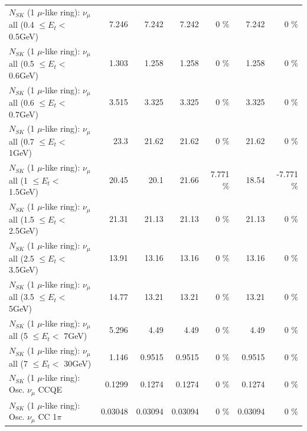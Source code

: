 \begin{table}
\begin{tabular}{| l | r | r | r  r | r  r |}
       $N_{SK}$ (1 $\mu$-like ring): $\nu_{\mu}$ all (0.4 $\leq E_{t} <$ 0.5GeV) &           7.246 &           7.242 &           7.242 &        0 \%  &           7.242 &        0 \%  \\ 
       $N_{SK}$ (1 $\mu$-like ring): $\nu_{\mu}$ all (0.5 $\leq E_{t} <$ 0.6GeV) &           1.303 &           1.258 &           1.258 &        0 \%  &           1.258 &        0 \%  \\ 
       $N_{SK}$ (1 $\mu$-like ring): $\nu_{\mu}$ all (0.6 $\leq E_{t} <$ 0.7GeV) &           3.515 &           3.325 &           3.325 &        0 \%  &           3.325 &        0 \%  \\ 
         $N_{SK}$ (1 $\mu$-like ring): $\nu_{\mu}$ all (0.7 $\leq E_{t} <$ 1GeV) &            23.3 &           21.62 &           21.62 &        0 \%  &           21.62 &        0 \%  \\ 
         $N_{SK}$ (1 $\mu$-like ring): $\nu_{\mu}$ all (1 $\leq E_{t} <$ 1.5GeV) &           20.45 &            20.1 &           21.66 &    7.771 \%  &           18.54 &   -7.771 \%  \\ 
       $N_{SK}$ (1 $\mu$-like ring): $\nu_{\mu}$ all (1.5 $\leq E_{t} <$ 2.5GeV) &           21.31 &           21.13 &           21.13 &        0 \%  &           21.13 &        0 \%  \\ 
       $N_{SK}$ (1 $\mu$-like ring): $\nu_{\mu}$ all (2.5 $\leq E_{t} <$ 3.5GeV) &           13.91 &           13.16 &           13.16 &        0 \%  &           13.16 &        0 \%  \\ 
         $N_{SK}$ (1 $\mu$-like ring): $\nu_{\mu}$ all (3.5 $\leq E_{t} <$ 5GeV) &           14.77 &           13.21 &           13.21 &        0 \%  &           13.21 &        0 \%  \\ 
           $N_{SK}$ (1 $\mu$-like ring): $\nu_{\mu}$ all (5 $\leq E_{t} <$ 7GeV) &           5.296 &            4.49 &            4.49 &        0 \%  &            4.49 &        0 \%  \\ 
          $N_{SK}$ (1 $\mu$-like ring): $\nu_{\mu}$ all (7 $\leq E_{t} <$ 30GeV) &           1.146 &          0.9515 &          0.9515 &        0 \%  &          0.9515 &        0 \%  \\ 
\hline
\hline
                               $N_{SK}$ (1 $\mu$-like ring): Osc. $\nu_\mu$ CCQE &          0.1299 &          0.1274 &          0.1274 &        0 \%  &          0.1274 &        0 \%  \\ 
                          $N_{SK}$ (1 $\mu$-like ring): Osc. $\nu_\mu$ CC 1$\pi$ &         0.03048 &         0.03094 &         0.03094 &        0 \%  &         0.03094 &        0 \%  \\ 

\end{tabular}
\end{table}
